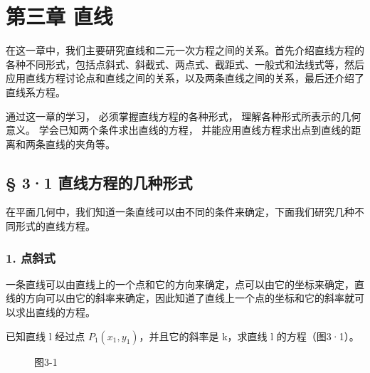 \chapter{第三章 直线}\label{ux7b2cux4e09ux7ae0-ux76f4ux7ebf}

在这一章中，我们主要研究直线和二元一次方程之间的关系。首先介绍直线方程的各种不同形式，包括点斜式、斜截式、两点式、截距式、一般式和法线式等，然后应用直线方程讨论点和直线之间的关系，以及两条直线之间的关系，最后还介绍了直线系方程。

通过这一章的学习， 必须掌握直线方程的各种形式，
理解各种形式所表示的几何意义。 学会已知两个条件求出直线的方程，
并能应用直线方程求出点到直线的距离和两条直线的夹角等。

\section{§ 3·1
直线方程的几种形式}\label{ux76f4ux7ebfux65b9ux7a0bux7684ux51e0ux79cdux5f62ux5f0f}

在平面几何中，我们知道一条直线可以由不同的条件来确定，下面我们研究几种不同形式的直线方程。

\subsection{1. 点斜式}\label{ux70b9ux659cux5f0f}

一条直线可以由直线上的一个点和它的方向来确定，点可以由它的坐标来确定，直线的方向可以由它的斜率来确定，因此知道了直线上一个点的坐标和它的斜率就可以求出直线的方程。

已知直线 l 经过点 \(P_{1}(x_{1}, y_{1})\)，并且它的斜率是 k，求直线 l
的方程（图3·1）。

\begin{figure}
\centering
{}
\caption{图3-1}
\end{figure}

